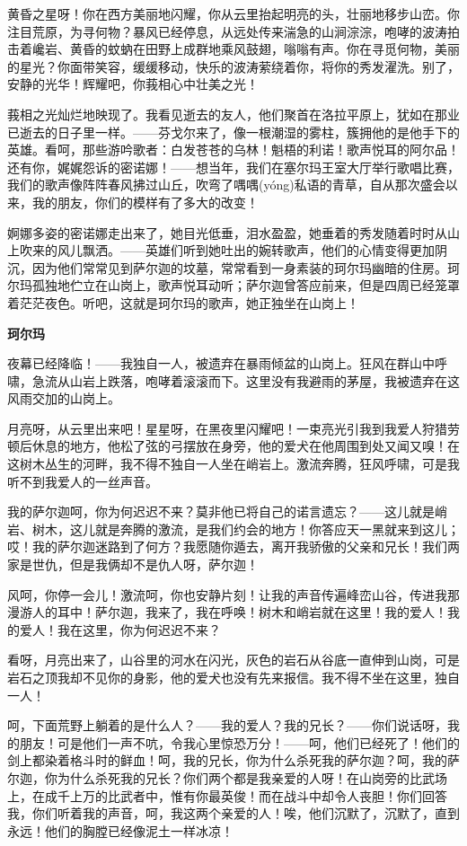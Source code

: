 \documentclass[12pt,oneside]{book}
\begin{document}
黄昏之星呀！你在西方美丽地闪耀，你从云里抬起明亮的头，壮丽地移步山峦。你注目荒原，为寻何物？暴风已经停息，从远处传来湍急的山涧淙淙，咆哮的波涛拍击着巉岩、黄昏的蚊蚋在田野上成群地乘风鼓翅，嗡嗡有声。你在寻觅何物，美丽的星光？你面带笑容，缓缓移动，快乐的波涛萦绕着你，将你的秀发濯洗。别了，安静的光华！辉耀吧，你莪相心中壮美之光！

莪相之光灿烂地映现了。我看见逝去的友人，他们聚首在洛拉平原上，犹如在那业已逝去的日子里一样。——芬戈尔来了，像一根潮湿的雾柱，簇拥他的是他手下的英雄。看呵，那些游吟歌者：白发苍苍的乌林！魁梧的利诺！歌声悦耳的阿尔品！还有你，娓娓怨诉的密诺娜！——想当年，我们在塞尔玛王室大厅举行歌唱比赛，我们的歌声像阵阵春风拂过山丘，吹弯了喁喁(yóng)私语的青草，自从那次盛会以来，我的朋友，你们的模样有了多大的改变！

婀娜多姿的密诺娜走出来了，她目光低垂，泪水盈盈，她垂着的秀发随着时时从山上吹来的风儿飘洒。——英雄们听到她吐出的婉转歌声，他们的心情变得更加阴沉，因为他们常常见到萨尔迦的坟墓，常常看到一身素装的珂尔玛幽暗的住房。珂尔玛孤独地伫立在山岗上，歌声悦耳动听；萨尔迦曾答应前来，但是四周已经笼罩着茫茫夜色。听吧，这就是珂尔玛的歌声，她正独坐在山岗上！

\begin{center}
\textbf{珂尔玛}
\end{center}


夜幕已经降临！——我独自一人，被遗弃在暴雨倾盆的山岗上。狂风在群山中呼啸，急流从山岩上跌落，咆哮着滚滚而下。这里没有我避雨的茅屋，我被遗弃在这风雨交加的山岗上。

月亮呀，从云里出来吧！星星呀，在黑夜里闪耀吧！一束亮光引我到我爱人狩猎劳顿后休息的地方，他松了弦的弓摆放在身旁，他的爱犬在他周围到处又闻又嗅！在这树木丛生的河畔，我不得不独自一人坐在峭岩上。激流奔腾，狂风呼啸，可是我听不到我爱人的一丝声音。

我的萨尔迦呵，你为何迟迟不来？莫非他已将自己的诺言遗忘？——这儿就是峭岩、树木，这儿就是奔腾的激流，是我们约会的地方！你答应天一黑就来到这儿；哎！我的萨尔迦迷路到了何方？我愿随你遁去，离开我骄傲的父亲和兄长！我们两家是世仇，但是我俩却不是仇人呀，萨尔迦！

风呵，你停一会儿！激流呵，你也安静片刻！让我的声音传遍峰峦山谷，传进我那漫游人的耳中！萨尔迦，我来了，我在呼唤！树木和峭岩就在这里！我的爱人！我的爱人！我在这里，你为何迟迟不来？

看呀，月亮出来了，山谷里的河水在闪光，灰色的岩石从谷底一直伸到山岗，可是岩石之顶我却不见你的身影，他的爱犬也没有先来报信。我不得不坐在这里，独自一人！

呵，下面荒野上躺着的是什么人？——我的爱人？我的兄长？——你们说话呀，我的朋友！可是他们一声不吭，令我心里惊恐万分！——呵，他们已经死了！他们的剑上都染着格斗时的鲜血！呵，我的兄长，你为什么杀死我的萨尔迦？呵，我的萨尔迦，你为什么杀死我的兄长？你们两个都是我亲爱的人呀！在山岗旁的比武场上，在成千上万的比武者中，惟有你最英俊！而在战斗中却令人丧胆！你们回答我，你们听着我的声音，呵，我这两个亲爱的人！唉，他们沉默了，沉默了，直到永远！他们的胸膛已经像泥土一样冰凉！
\end{document}

